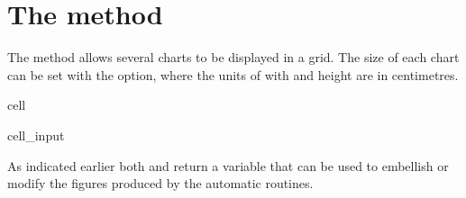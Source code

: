 \documentclass[letterpaper,10pt,english]{jupyterBook}
\begin{document}
\section{The  method}
\label{\detokenize{content/05_WBModels/ScenarioAnalysis:the-keep-plot-multi-method}}
\sphinxAtStartPar
The  method allows several charts to be displayed in a grid.  The size of each chart can be set with the  option, where the units of with and height are in centimetres.

\begin{sphinxuseclass}{cell}\begin{sphinxVerbatimInput}

\begin{sphinxuseclass}{cell_input}
\begin{sphinxVerbatim}[commandchars=\\\{\}]
 
     
          
                                   
\end{sphinxVerbatim}

\end{sphinxuseclass}\end{sphinxVerbatimInput}

\end{sphinxuseclass}
\sphinxAtStartPar
As indicated earlier both  and  return a variable that can be used to embellish or modify the figures produced by the automatic routines.
\end{document}
